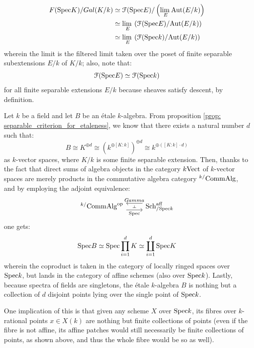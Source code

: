 \begin{corollary}
                $$
                    \begin{aligned}
                        F(\mathrm{Spec} K)/Gal(K/k) & \simeq \mathcal{F}(\mathrm{Spec} E)/\left(\underset{E}{\operatorname{lim} \:} \mathrm{Aut}(E/k)\right)
                        \\
                        & \simeq \underset{E}{\operatorname{lim} \:} \left(\mathcal{F}(\mathrm{Spec} E)/\mathrm{Aut}(E/k)\right)
                        \\
                        & \simeq \underset{E}{\operatorname{lim} \:} \left(\mathcal{F}(\mathrm{Spec} k)/\mathrm{Aut}(E/k)\right)
                    \end{aligned}
                $$
            wherein the limit is the filtered limit taken over the poset of finite separable subextensions $E/k$ of $K/k$; also, note that:
                $$\mathcal{F}(\mathrm{Spec} E) \simeq \mathcal{F}(\mathrm{Spec} k)$$
            for all finite separable extensions $E/k$ because sheaves satisfy descent, by definition.
        \end{corollary}
        \begin{remark} \label{remark: fibres_of_etale_maps_over_points}
            Let $k$ be a field and let $B$ be an \'etale $k$-algebra. From proposition \ref{prop: separable_criterion_for_etaleness}, we know that there exists a natural number $d$ such that:
                $$B \cong K^{\oplus d} \cong (k^{\oplus [K : k]})^{\oplus d} \cong k^{\oplus ([K : k] \cdot d)}$$
            as $k$-vector spaces, where $K/k$ is some finite separable extension. Then, thanks to the fact that direct sums of algebra objects in the category $k\mathrm{Vect}$ of $k$-vector spaces are merely products in the commutative algebra category ${}^{k/}\mathrm{Comm}\mathrm{Alg}$, and by employing the adjoint equivalence:
                $$
                    \begin{tikzcd}
                    	{{}^{k/}\Comm\Alg^{\op}} & {\Sch^{\aff}_{/\Spec k}}
                    	\arrow[""{name=0, anchor=center, inner sep=0}, "\Spec"', shift right=2, from=1-1, to=1-2]
                    	\arrow[""{name=1, anchor=center, inner sep=0}, "Gamma"', shift right=2, from=1-2, to=1-1]
                    	\arrow["\dashv"{anchor=center, rotate=-90}, draw=none, from=1, to=0]
                    \end{tikzcd}
                $$
            one gets:
                $$\mathrm{Spec} B \simeq \mathrm{Spec} \prod_{i = 1}^d K \simeq \coprod_{i = 1}^d \mathrm{Spec} K$$
            wherein the coproduct is taken in the category of locally ringed spaces over $\mathrm{Spec} k$, but lands in the category of affine schemes (also over $\mathrm{Spec} k$). Lastly, because spectra of fields are singletons, the \'etale $k$-algebra $B$ is nothing but a collection of $d$ disjoint points lying over the single point of $\mathrm{Spec} k$. 
            
            One implication of this is that given any scheme $X$ over $\mathrm{Spec} k$, its fibres over $k$-rational points $x \in X(k)$ are nothing but finite collections of points (even if the fibre is not affine, its affine patches would still necessarily be finite collections of points, as shown above, and thus the whole fibre would be so as well).
        \end{remark}

